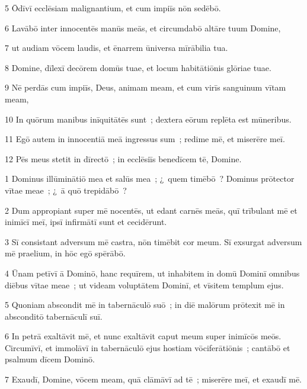 \psalmVerse
  {\phantom{00}5}
  {Ōdīvī ecclēsiam malignantium, et cum impiīs nōn sedēbō.}


\psalmVerse
  {\phantom{00}6}
  {Lavābō inter innocentēs manūs meās, et circumdabō altāre tuum Domine,}


\psalmVerse
  {\phantom{00}7}
  {ut audiam vōcem laudis, et ēnarrem ūniversa mīrābilia tua.}


\psalmVerse
  {\phantom{00}8}
  {Domine, dīlexī decōrem domūs tuae, et locum habitātiōnis glōriae tuae.}


\psalmVerse
  {\phantom{00}9}
  {Nē perdās cum impiīs, Deus, animam meam, et cum virīs sanguinum vītam meam,}


\psalmVerse
  {\phantom{0}10}
  {In quōrum manibus inīquitātēs sunt~; dextera eōrum replēta est mūneribus.}


\psalmVerse
  {\phantom{0}11}
  {Egō autem in innocentiā meā ingressus sum~; redime mē, et miserēre meī.}


\psalmVerse
  {\phantom{0}12}
  {Pēs meus stetit in dīrectō~; in ecclēsiīs benedīcem tē, Domine.}



\psalmVerse
  {\phantom{00}1}
  {Dominus illūminātiō mea et salūs mea~; ¿~quem timēbō~? Dominus prōtector vītae meae~; ¿~ā quō trepidābō~?}


\psalmVerse
  {\phantom{00}2}
  {Dum appropiant super mē nocentēs, ut edant carnēs meās, quī trībulant mē et inimīcī meī, ipsī infirmātī sunt et cecidērunt.}


\psalmVerse
  {\phantom{00}3}
  {Sī consistant adversum mē castra, nōn timēbit cor meum. Sī exsurgat adversum mē praelium, in hōc egō spērābō.}


\psalmVerse
  {\phantom{00}4}
  {Ūnam petīvī ā Dominō, hanc requīrem, ut inhabitem in domū Dominī omnibus diēbus vītae meae~; ut videam voluptātem Dominī, et vīsitem templum ejus.}


\psalmVerse
  {\phantom{00}5}
  {Quoniam abscondit mē in tabernāculō suō~; in diē malōrum prōtexit mē in absconditō tabernāculī suī.}


\psalmVerse
  {\phantom{00}6}
  {In petrā exaltāvit mē, et nunc exaltāvit caput meum super inimīcōs meōs. Circumīvī, et immolāvī in tabernāculō ejus hostiam vōciferātiōnis~; cantābō et psalmum dīcem Dominō.}


\psalmVerse
  {\phantom{00}7}
  {Exaudī, Domine, vōcem meam, quā clāmāvī ad tē~; miserēre meī, et exaudī mē.}


